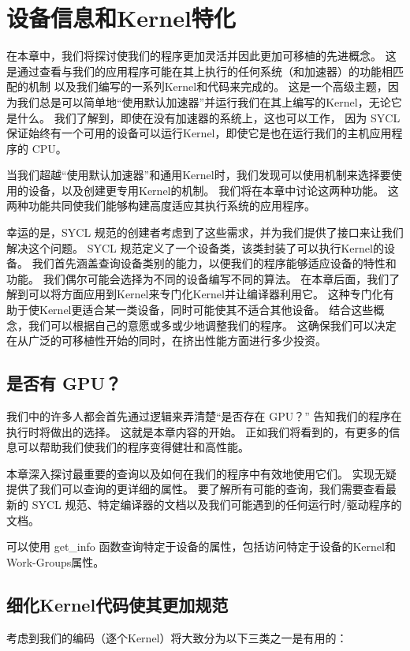 \section{设备信息和Kernel特化}
在本章中，我们将探讨使我们的程序更加灵活并因此更加可移植的先进概念。 
这是通过查看与我们的应用程序可能在其上执行的任何系统（和加速器）的功能相匹配的机制
以及我们编写的一系列Kernel和代码来完成的。 
这是一个高级主题，因为我们总是可以简单地“使用默认加速器”并运行我们在其上编写的Kernel，无论它是什么。 
我们了解到，即使在没有加速器的系统上，这也可以工作，
因为 SYCL 保证始终有一个可用的设备可以运行Kernel，即使它是也在运行我们的主机应用程序的 CPU。

当我们超越“使用默认加速器”和通用Kernel时，我们发现可以使用机制来选择要使用的设备，以及创建更专用Kernel的机制。 
我们将在本章中讨论这两种功能。 这两种功能共同使我们能够构建高度适应其执行系统的应用程序。

幸运的是，SYCL 规范的创建者考虑到了这些需求，并为我们提供了接口来让我们解决这个问题。 
SYCL 规范定义了一个设备类，该类封装了可以执行Kernel的设备。 
我们首先涵盖查询设备类别的能力，以便我们的程序能够适应设备的特性和功能。 
我们偶尔可能会选择为不同的设备编写不同的算法。 
在本章后面，我们了解到可以将方面应用到Kernel来专门化Kernel并让编译器利用它。 
这种专门化有助于使Kernel更适合某一类设备，同时可能使其不适合其他设备。 
结合这些概念，我们可以根据自己的意愿或多或少地调整我们的程序。 
这确保我们可以决定在从广泛的可移植性开始的同时，在挤出性能方面进行多少投资。

\subsection{是否有 GPU？}
我们中的许多人都会首先通过逻辑来弄清楚“是否存在 GPU？” 告知我们的程序在执行时将做出的选择。 
这就是本章内容的开始。 正如我们将看到的，有更多的信息可以帮助我们使我们的程序变得健壮和高性能。

本章深入探讨最重要的查询以及如何在我们的程序中有效地使用它们。 实现无疑提供了我们可以查询的更详细的属性。 
要了解所有可能的查询，我们需要查看最新的 SYCL 规范、特定编译器的文档以及我们可能遇到的任何运行时/驱动程序的文档。

可以使用 get\_info 函数查询特定于设备的属性，包括访问特定于设备的Kernel和Work-Groups属性。

\subsection{细化Kernel代码使其更加规范}
考虑到我们的编码（逐个Kernel）将大致分为以下三类之一是有用的：

